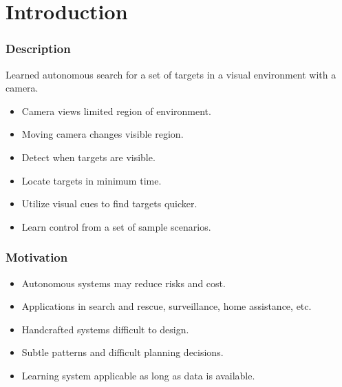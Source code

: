 
\section{Introduction}

\begin{frame}
    \frametitle{Description}
    
    Learned autonomous search for a set of targets in a visual environment with a camera.
    
    \begin{itemize}
        \item Camera views limited region of environment. 
        \item Moving camera changes visible region.
        \item Detect when targets are visible.
        \item Locate targets in minimum time.
        \item Utilize visual cues to find targets quicker.
        \item Learn control from a set of sample scenarios.
    \end{itemize}
\end{frame}

\begin{frame}
    \frametitle{Motivation}
    
    \begin{itemize}
        \item Autonomous systems may reduce risks and cost.
        \item Applications in search and rescue, surveillance, home assistance, etc.
        \item Handcrafted systems difficult to design.
        \item Subtle patterns and difficult planning decisions.
        \item Learning system applicable as long as data is available.
    \end{itemize}
\end{frame}


